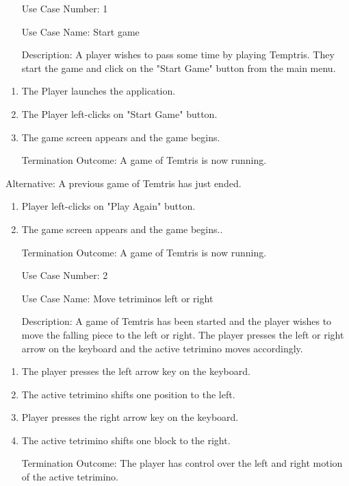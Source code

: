 \documentclass[10pt,conference,onecolumn,compsoc]{IEEEtran}
\begin{document}
\begin{itemize}
\item[Use Case Number:] 1
\item[Use Case Name:] Start game
\item[Description:] A player wishes to pass some time by playing Temptris. They start the game and click on the "Start Game" button from the main menu.
\end{itemize}

\begin{enumerate}
\item The Player launches the application.
\item The Player left-clicks on "Start Game" button.
\item The game screen appears and the game begins.
\item[Termination Outcome:] A game of Temtris is now running.
\end{enumerate}

Alternative: A previous game of Temtris has just ended.
\begin{enumerate}
\item Player left-clicks on "Play Again" button.
\item The game screen appears and the game begins..
\item[Termination Outcome:] A game of Temtris is now running.
\end{enumerate}

\begin{itemize}
\item[Use Case Number:] 2
\item[Use Case Name:] Move tetriminos left or right
\item[Description:] A game of Temtris has been started and the player wishes to move the falling piece to the left or right. The player presses the left or right arrow on the keyboard and the active tetrimino moves accordingly.
\end{itemize}

\begin{enumerate}
\item The player presses the left arrow key on the keyboard.
\item The active tetrimino shifts one position to the left.
\item Player presses the right arrow key on the keyboard.
\item The active tetrimino shifts one block to the right.
\item[Termination Outcome:] The player has control over the left and right motion of the active tetrimino.
\end{enumerate}
\end{document}
